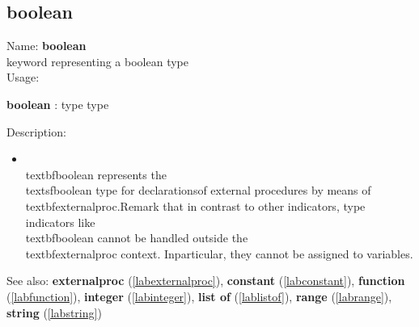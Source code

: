 \subsection{boolean}
\label{labboolean}
\noindent Name: \textbf{boolean}\\
keyword representing a \textsf{boolean} type \\
\noindent Usage: 
\begin{center}
\textbf{boolean} : \textsf{type type}\\
\end{center}
\noindent Description: \begin{itemize}

\item \\textbf{boolean} represents the \\textsf{boolean} type for declarations\n   of external procedures by means of \\textbf{externalproc}.\n    \n   Remark that in contrast to other indicators, type indicators like\n   \\textbf{boolean} cannot be handled outside the \\textbf{externalproc} context.  In\n   particular, they cannot be assigned to variables.\n\end{itemize}
See also: \textbf{externalproc} (\ref{labexternalproc}), \textbf{constant} (\ref{labconstant}), \textbf{function} (\ref{labfunction}), \textbf{integer} (\ref{labinteger}), \textbf{list of} (\ref{lablistof}), \textbf{range} (\ref{labrange}), \textbf{string} (\ref{labstring})

